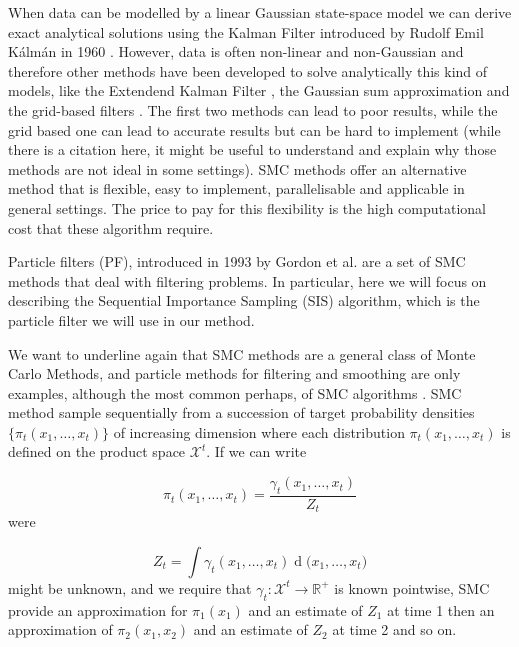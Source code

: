 \documentclass[11pt,a4paper]{article}
\renewcommand{\d}[1]{\ensuremath{\operatorname{d}\!{#1}}}
\begin{document}
When data can be modelled by a linear Gaussian state-space model we can derive exact analytical solutions using the Kalman Filter introduced by Rudolf Emil K\'alm\'an in 1960 \cite{Kalman}. However, data is often non-linear and non-Gaussian and therefore other methods have been developed to solve analytically this kind of models, like the Extendend Kalman Filter \cite{Anderson} \cite{Jazwinski}, the Gaussian sum approximation \cite{Soreson} and the grid-based filters \cite{Bucy}. The first two methods can lead to poor results, while the grid based one can lead to accurate results but can be hard to implement (while there is a citation here, it might be useful to understand and explain why those methods are not ideal in some settings). SMC methods offer an alternative method that is flexible, easy to implement, parallelisable and applicable in general settings\cite{DoucetBook}. The price to pay for this flexibility is the high computational cost that these algorithm require.

Particle filters (PF), introduced in 1993 by Gordon et al. \cite{Gordon} are a set of SMC methods that deal with filtering problems. In particular, here we will focus on describing the Sequential Importance Sampling (SIS) algorithm, which is the particle filter we will use in our method.

We want to underline again that SMC methods are a general class of Monte Carlo Methods, and particle methods for filtering and smoothing are only examples, although the most common perhaps, of SMC algorithms \cite{DoucetTutorial}. SMC method sample sequentially from a succession of target probability densities $\{ \pi_t(x_1, \dots, x_t) \}$ of increasing dimension where each distribution $\pi_t(x_1, \dots, x_t)$ is defined on the product space $\mathcal{X}^t$. If we can write

\begin{equation} \label{eq:pi1}
    \pi_t(x_1, \dots, x_t) = \frac{\gamma_t(x_1, \dots, x_t)}{Z_t}
\end{equation}
were

\begin{equation} \label{eq:Z1}
    Z_t = \int \gamma_t(x_1, \dots, x_t) \d (x_1, \dots, x_t)
\end{equation}
might be unknown, and we require that $\gamma_t : \mathcal{X}^t \rightarrow \mathbb{R}^+$ is known pointwise, SMC provide an approximation for $\pi_1(x_1)$ and an estimate of $Z_1$ at time 1 then an approximation of $\pi_2(x_1, x_2)$ and an estimate of $Z_2$ at time 2 and so on.
\end{document}
